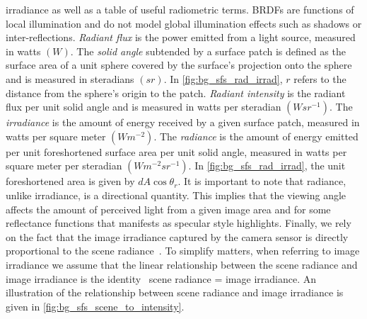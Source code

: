 irradiance as well as a table of useful radiometric terms. BRDFs are functions
of local illumination and do not model global illumination effects such
as shadows or inter-reflections.
\textit{Radiant flux} is the power emitted from a light source, measured in
watts $(W)$.
The \textit{solid angle} subtended by a surface patch is defined as the
surface area of a unit sphere covered by the surface's projection onto the
sphere and is measured in steradians $(sr)$. In \cref{fig:bg_sfs_rad_irrad},
$r$ refers to the distance from the sphere's origin to the patch.
\textit{Radiant intensity} is the radiant flux per unit solid angle and is
measured in watts per steradian $(W {sr}^{-1})$.
The \textit{irradiance} is the amount of energy received by a given surface
patch, measured in watts per square meter $(W m^{-2})$.
The \textit{radiance} is the amount of energy emitted per unit foreshortened
surface area per unit solid angle, measured in watts per square meter
per steradian $(W m^{-2} {sr}^{-1})$. In \cref{fig:bg_sfs_rad_irrad},
the unit foreshortened area is given by $dA \cos{\theta_r}$.
It is important to note that radiance, unlike irradiance, is a directional
quantity. This implies that the viewing angle affects the amount of perceived
light from a given image area and for some reflectance functions that manifests
as specular style highlights. Finally, we rely on the fact that the image
irradiance captured by the camera sensor is directly proportional to the
scene radiance~\cite{horn1979calculating}. To simplify matters, when referring
to image irradiance we assume that the linear relationship between the scene
radiance and image irradiance is the identity
\ie~scene radiance = image irradiance. An illustration of the relationship
between scene radiance and image irradiance is given in
\cref{fig:bg_sfs_scene_to_intensity}.

